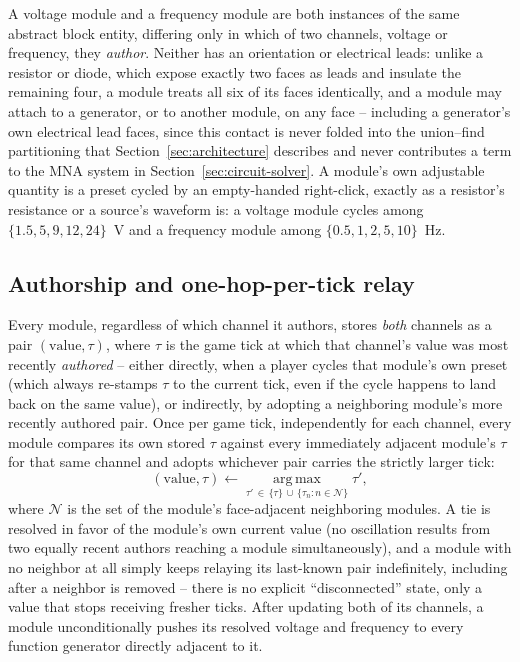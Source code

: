 A voltage module and a frequency module are both instances of the same abstract block
entity, differing only in which of two channels, voltage or frequency, they \emph{author}.
Neither has an orientation or electrical leads: unlike a resistor or diode, which expose
exactly two faces as leads and insulate the remaining four, a module treats all six of its
faces identically, and a module may attach to a generator, or to another module, on any
face -- including a generator's own electrical lead faces, since this contact is never
folded into the union--find partitioning that Section~\ref{sec:architecture} describes and
never contributes a term to the MNA system in Section~\ref{sec:circuit-solver}. A module's
own adjustable quantity is a preset cycled by an empty-handed right-click, exactly as a
resistor's resistance or a source's waveform is: a voltage module cycles among
$\{1.5, 5, 9, 12, 24\}$~V and a frequency module among $\{0.5, 1, 2, 5, 10\}$~Hz.

\subsection{Authorship and one-hop-per-tick relay}

Every module, regardless of which channel it authors, stores \emph{both} channels as a pair
$(\text{value}, \tau)$, where $\tau$ is the game tick at which that channel's value was most
recently \emph{authored} -- either directly, when a player cycles that module's own preset
(which always re-stamps $\tau$ to the current tick, even if the cycle happens to land back
on the same value), or indirectly, by adopting a neighboring module's more recently authored
pair. Once per game tick, independently for each channel, every module compares its own
stored $\tau$ against every immediately adjacent module's $\tau$ for that same channel and
adopts whichever pair carries the strictly larger tick:
\begin{equation}
(\text{value}, \tau) \leftarrow \operatorname*{arg\,max}_{\tau' \,\in\, \{\tau\} \,\cup\,
\{\tau_n : n \in \mathcal{N}\}} \tau',
\end{equation}
where $\mathcal{N}$ is the set of the module's face-adjacent neighboring modules. A tie is
resolved in favor of the module's own current value (no oscillation results from two
equally recent authors reaching a module simultaneously), and a module with no neighbor at
all simply keeps relaying its last-known pair indefinitely, including after a neighbor is
removed -- there is no explicit ``disconnected'' state, only a value that stops receiving
fresher ticks. After updating both of its channels, a module unconditionally pushes its
resolved voltage and frequency to every function generator directly adjacent to it.

